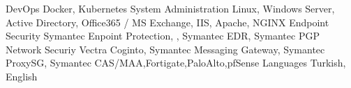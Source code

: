 

\begin{cvskills}
  \cvskill
    {DevOps} %
    {Docker, Kubernetes} %
  \cvskill
    {System Administration} %
    {Linux, Windows Server, Active Directory, Office365 / MS Exchange, IIS, Apache, NGINX} %
  \cvskill
    {Endpoint Security} %
    {Symantec Enpoint Protection, , Symantec EDR, Symantec PGP} %
  \cvskill
    {Network Securiy} %
    {Vectra Coginto, Symantec Messaging Gateway, Symantec ProxySG, Symantec CAS/MAA,Fortigate,PaloAlto,pfSense } %
  \cvskill
    {Languages} %
    {Turkish, English} %
\end{cvskills}